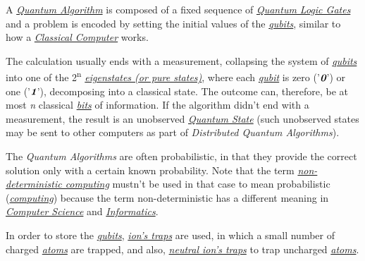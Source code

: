 \documentclass[conference]{IEEEtran}
\begin{document}
\vspace{4pt}

 A \href{https://en.wikipedia.org/wiki/Quantum_algorithm}{\textit{Quantum Algorithm}} is composed of a fixed sequence of \href{https://en.wikipedia.org/wiki/Quantum_logic_gate}{\textit{Quantum Logic Gates}} and a problem is encoded by setting the initial values of the \href{https://en.wikipedia.org/wiki/Qubit}{\textit{qubits}}, similar to how a \href{https://en.wikipedia.org/wiki/Von_Neumann_architecture}{\textit{Classical Computer}} works.
 
 \vspace{4pt}
 
 The calculation usually ends with a measurement, collapsing the system of \href{https://en.wikipedia.org/wiki/Qubit}{\textit{qubits}} into one of the 2\textsuperscript{n} \href{https://en.wikipedia.org/wiki/Quantum_state#Pure_states}{\textit{eigenstates (or pure states)}}, where each \href{https://en.wikipedia.org/wiki/Qubit}{\textit{qubit}} is zero ('$\textit{\textbf{0}}$') or one ('$\textit{\textbf{1}}$'), decomposing into a classical state. The outcome can, therefore, be at most \textit{n} classical \href{https://en.wikipedia.org/wiki/Bit}{\textit{bits}} of information. If the algorithm didn't end with a measurement, the result is an unobserved \href{https://en.wikipedia.org/wiki/Quantum_state}{\textit{Quantum State}} (such unobserved states may be sent to other computers as part of \textit{Distributed Quantum Algorithms}).

\newpage

The \textit{Quantum Algorithms} are often probabilistic, in that they provide the correct solution only with a certain known probability. Note that the term \href{https://en.wikipedia.org/wiki/Non-deterministic_Turing_machine}{\textit{non-deterministic computing}} mustn't be used in that case to mean probabilistic (\href{https://en.wikipedia.org/wiki/Computing}{\textit{computing}}) because the term non-deterministic has a different meaning in \href{https://en.wikipedia.org/wiki/Computer_science}{\textit{Computer Science}} and \href{https://en.wikipedia.org/wiki/Informatics}{\textit{Informatics}}.

\vspace{4pt}

In order to store the \href{https://en.wikipedia.org/wiki/Qubit}{\textit{qubits}}, \href{https://en.wikipedia.org/wiki/Ion_trap}{\textit{ion's traps}} are used, in which a small number of charged \href{https://en.wikipedia.org/wiki/Atom}{\textit{atoms}} are trapped, and also, \href{https://en.wikipedia.org/wiki/Magnetic_trap_(atoms)}{\textit{neutral ion's traps}} to trap uncharged \href{https://en.wikipedia.org/wiki/Atom}{\textit{atoms}}.
\end{document}
